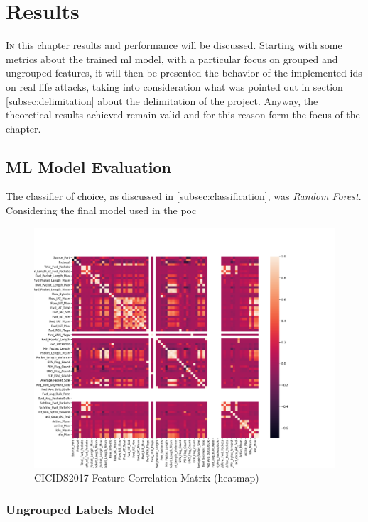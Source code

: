\chapter{Results}
\label{chap:results}

\lettrine[lines=4, findent=3pt, nindent=0pt]{I}{n} this chapter results and performance will be discussed. Starting with some metrics about the trained \gls{ml} model, with a particular focus on grouped and ungrouped features, it will then be presented the behavior of the implemented \gls{ids} on real life attacks, taking into consideration what was pointed out in section \ref{subsec:delimitation} about the delimitation of the project. Anyway, the theoretical results achieved remain valid and for this reason form the focus of the chapter.

\section{ML Model Evaluation}
\label{sec:ml-model-evaluation}

The classifier of choice, as discussed in \ref{subsec:classification}, was \textit{Random Forest}. Considering the final model used in the \gls{poc}

\begin{figure}[h!]
   \centering
   \includegraphics[scale=0.5]{assets/figures/chapter3/heatmap-all.png}
   \caption{CICIDS2017 Feature Correlation Matrix (heatmap)}
   \label{fig:feature-heatmap}
\end{figure}

\subsection{Ungrouped Labels Model}
\label{subsec:ungrouped-training}

